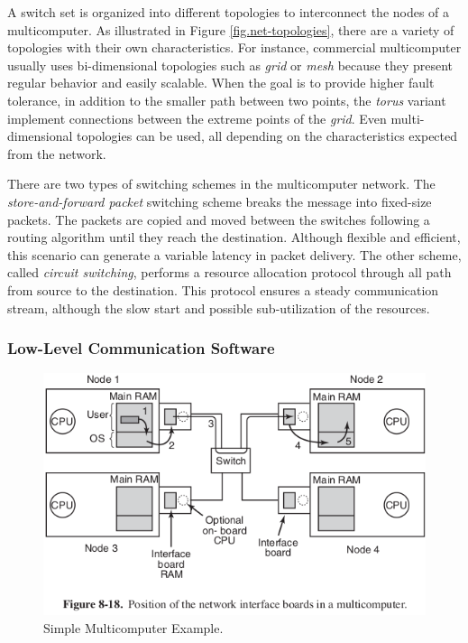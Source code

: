 				A switch set is organized into different topologies to interconnect
				the nodes of a multicomputer.
				As illustrated in Figure \ref{fig.net-topologies}, there are a
				variety of topologies with their own characteristics.
				For instance, commercial multicomputer usually uses bi-dimensional
				topologies such as \textit{grid} or \textit{mesh} because they present
				regular behavior and easily scalable.
				When the goal is to provide higher fault tolerance, in addition to the
				smaller path between two points, the \textit{torus} variant implement
				connections between the extreme points of the \textit{grid}.
				Even multi-dimensional topologies can be used, all depending on the
				characteristics expected from the network.

				There are two types of switching schemes in the multicomputer network.
				The \textit{store-and-forward packet} switching scheme breaks the message
				into fixed-size packets.
				The packets are copied and moved between the switches following a
				routing algorithm until they reach the destination.
				Although flexible and efficient, this scenario can generate a variable
				latency in packet delivery.
				The other scheme, called \textit{circuit switching}, performs a resource
				allocation protocol through all path from source to the destination.
				This protocol ensures a steady communication stream, although the
				slow start and possible sub-utilization of the resources.

			\subsubsection{Low-Level Communication Software}
			\label{sec.multicomputers-low-sw}

				\begin{figure}[h]
					\centering
					\includegraphics[width=.8\textwidth]{images/multicomputer.png}

					\caption{
						Simple Multicomputer Example.
					}\par
					\label{fig.multicomputer}
				\end{figure}

